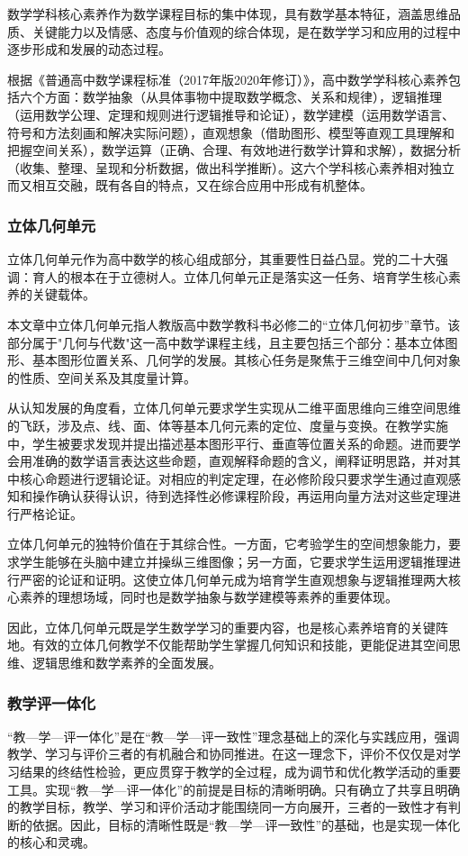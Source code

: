 \documentclass[UTF8,a4paper,12pt,twoside]{ctexart}
\begin{document}
数学学科核心素养作为数学课程目标的集中体现，具有数学基本特征，涵盖思维品质、关键能力以及情感、态度与价值观的综合体现，是在数学学习和应用的过程中逐步形成和发展的动态过程。

根据《普通高中数学课程标准（2017年版2020年修订）》，高中数学学科核心素养包括六个方面：数学抽象（从具体事物中提取数学概念、关系和规律），逻辑推理（运用数学公理、定理和规则进行逻辑推导和论证），数学建模（运用数学语言、符号和方法刻画和解决实际问题），直观想象（借助图形、模型等直观工具理解和把握空间关系），数学运算（正确、合理、有效地进行数学计算和求解），数据分析（收集、整理、呈现和分析数据，做出科学推断）。这六个学科核心素养相对独立而又相互交融，既有各自的特点，又在综合应用中形成有机整体。

\subsubsection{立体几何单元}

立体几何单元作为高中数学的核心组成部分，其重要性日益凸显。党的二十大强调：育人的根本在于立德树人。立体几何单元正是落实这一任务、培育学生核心素养的关键载体。

本文章中立体几何单元指人教版高中数学教科书必修二的“立体几何初步”章节。该部分属于"几何与代数"这一高中数学课程主线，且主要包括三个部分：基本立体图形、基本图形位置关系、几何学的发展。其核心任务是聚焦于三维空间中几何对象的性质、空间关系及其度量计算。

从认知发展的角度看，立体几何单元要求学生实现从二维平面思维向三维空间思维的飞跃，涉及点、线、面、体等基本几何元素的定位、度量与变换。在教学实施中，学生被要求发现并提出描述基本图形平行、垂直等位置关系的命题。进而要学会用准确的数学语言表达这些命题，直观解释命题的含义，阐释证明思路，并对其中核心命题进行逻辑论证。对相应的判定定理，在必修阶段只要求学生通过直观感知和操作确认获得认识，待到选择性必修课程阶段，再运用向量方法对这些定理进行严格论证。

立体几何单元的独特价值在于其综合性。一方面，它考验学生的空间想象能力，要求学生能够在头脑中建立并操纵三维图像；另一方面，它要求学生运用逻辑推理进行严密的论证和证明。这使立体几何单元成为培育学生直观想象与逻辑推理两大核心素养的理想场域，同时也是数学抽象与数学建模等素养的重要体现。

因此，立体几何单元既是学生数学学习的重要内容，也是核心素养培育的关键阵地。有效的立体几何教学不仅能帮助学生掌握几何知识和技能，更能促进其空间思维、逻辑思维和数学素养的全面发展。

\subsubsection{教学评一体化}
“教—学—评一体化”是在“教—学—评一致性”理念基础上的深化与实践应用，强调教学、学习与评价三者的有机融合和协同推进。在这一理念下，评价不仅仅是对学习结果的终结性检验，更应贯穿于教学的全过程，成为调节和优化教学活动的重要工具。实现“教—学—评一体化”的前提是目标的清晰明确。只有确立了共享且明确的教学目标，教学、学习和评价活动才能围绕同一方向展开，三者的一致性才有判断的依据。因此，目标的清晰性既是“教—学—评一致性”的基础，也是实现一体化的核心和灵魂。
\end{document}
